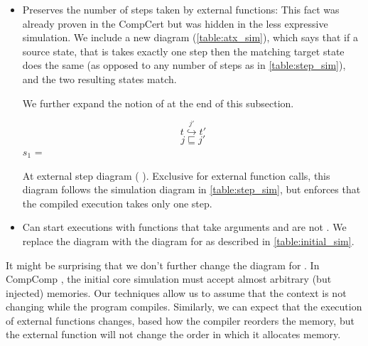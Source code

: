 \begin{itemize}
\item Preserves the number of steps taken by external functions: This fact was already proven in the CompCert but was hidden in the less expressive simulation. We include a new diagram (\autoref{table:atx_sim}),  which says that if a source state, that is  takes exactly one step then the matching target state does the same (as opposed to any number of steps as in  \autoref{table:step_sim}), and the two resulting states match. 

We further expand the notion of  at the end of this subsection.

\begin{table}\centering\begin{multicols}{2}

$$t \overset{j'}{\hookrightarrow} t'$$
$$j \sqsubseteq j'$$
 $s_1$ = 
\end{multicols}

\caption{At external step diagram ( ). Exclusive for external function calls, this diagram follows the simulation diagram in \autoref{table:step_sim}, but enforces that the compiled execution takes only one step. }\label{table:atx_sim}
\end{table}

\item Can start executions with functions that take arguments and are not . We replace the  diagram with  the diagram for  as described in \autoref{table:initial_sim}.

\end{itemize}

It might be surprising that we don't further change the diagram for . In CompComp \cite{compcomp}, the initial core simulation must accept almost arbitrary (but injected) memories. Our techniques allow us to assume that the context is not changing while the program compiles. Similarly, we can expect that the execution of external functions changes, based how the compiler reorders the memory, but the external function will not change the order in which it allocates memory.

